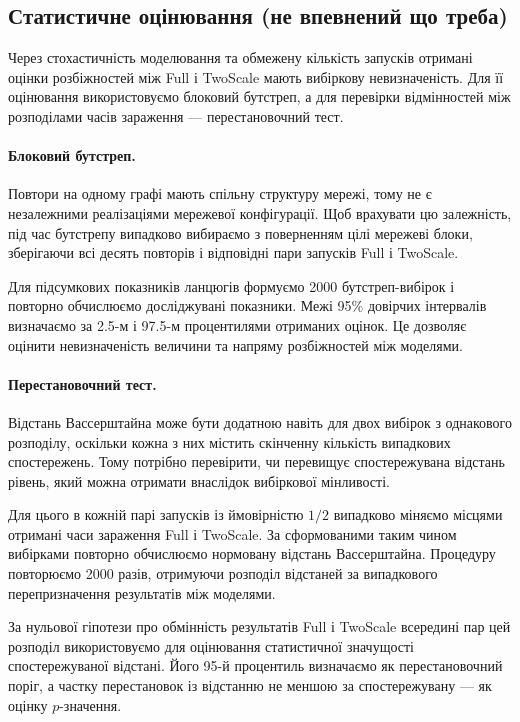 \documentclass[a4paper,fleqn]{cas-sc}
\begin{document}
\subsection{Статистичне оцінювання (не впевнений що треба)}

Через стохастичність моделювання та обмежену
кількість запусків отримані оцінки розбіжностей
між Full і TwoScale мають вибіркову невизначеність.
Для її оцінювання використовуємо блоковий бутстреп,
а для перевірки відмінностей між розподілами
часів зараження --- перестановочний тест.

\paragraph{Блоковий бутстреп.}
Повтори на одному графі мають спільну структуру
мережі, тому не є незалежними реалізаціями
мережевої конфігурації. Щоб врахувати цю
залежність, під час бутстрепу випадково
вибираємо з поверненням цілі мережеві блоки,
зберігаючи всі десять повторів і відповідні
пари запусків Full і TwoScale.

Для підсумкових показників ланцюгів формуємо
2000 бутстреп-вибірок і повторно обчислюємо
досліджувані показники. Межі 95\% довірчих
інтервалів визначаємо за 2.5-м і 97.5-м
процентилями отриманих оцінок.
Це дозволяє оцінити невизначеність величини
та напряму розбіжностей між моделями.

\paragraph{Перестановочний тест.}
Відстань Вассерштайна може бути додатною
навіть для двох вибірок з однакового розподілу,
оскільки кожна з них містить скінченну
кількість випадкових спостережень.
Тому потрібно перевірити, чи перевищує
спостережувана відстань рівень, який
можна отримати внаслідок вибіркової
мінливості.

Для цього в кожній парі запусків
із ймовірністю $1/2$ випадково міняємо
місцями отримані часи зараження
Full і TwoScale. За сформованими таким
чином вибірками повторно обчислюємо
нормовану відстань Вассерштайна.
Процедуру повторюємо 2000 разів,
отримуючи розподіл відстаней за випадкового
перепризначення результатів між моделями.

За нульової гіпотези про обмінність
результатів Full і TwoScale всередині пар
цей розподіл використовуємо для оцінювання
статистичної значущості спостережуваної
відстані. Його 95-й процентиль визначаємо
як перестановочний поріг, а частку
перестановок із відстанню не меншою
за спостережувану --- як оцінку
$p$-значення.
\end{document}
